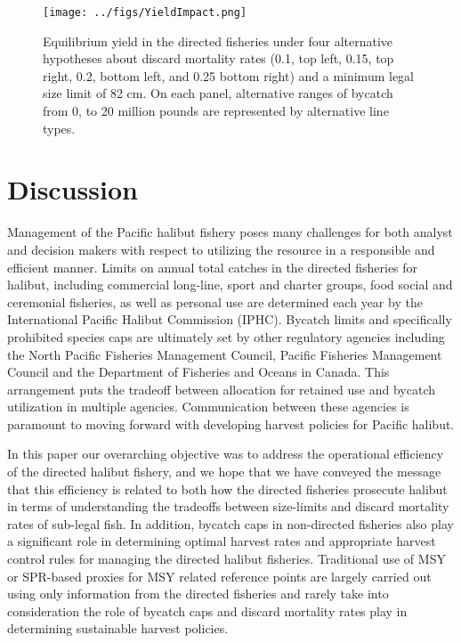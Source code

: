 \documentclass[12pt,leqno]{article}
\begin{document}
\begin{figure}
	\texttt{[image: ../figs/YieldImpact.png]}
	\caption{Equilibrium yield in the directed fisheries under four alternative hypotheses about discard mortality rates (0.1, top left, 0.15, top right, 0.2, bottom left, and 0.25 bottom right) and a minimum legal size limit of 82 cm. On each panel, alternative ranges of bycatch from 0, to 20 million pounds are represented by alternative line types.}\label{fig:YieldImpact}
\end{figure}


\section*{Discussion}

Management of the Pacific halibut fishery poses many challenges for both analyst and decision makers with respect to utilizing the resource in a responsible and efficient manner.  Limits on annual total catches in the directed fisheries for halibut, including commercial long-line, sport and charter groups, food social and ceremonial fisheries, as well as personal use are determined each year by the International Pacific Halibut Commission (IPHC).  Bycatch limits and specifically prohibited species caps are ultimately set by other regulatory agencies including the North Pacific Fisheries Management Council, Pacific Fisheries Management Council and the Department of Fisheries and Oceans in Canada.  This arrangement puts the tradeoff between allocation for retained use and bycatch utilization in multiple agencies. Communication between these agencies is paramount to moving forward with developing harvest policies for Pacific halibut.

In this paper our overarching objective was to address the operational efficiency of the directed halibut fishery, and we hope that we have conveyed the message that this efficiency is related to both how the directed fisheries prosecute halibut in terms of understanding the tradeoffs between size-limits and  discard mortality rates of sub-legal fish.  In addition, bycatch caps in non-directed fisheries also play a significant role in determining optimal harvest rates and appropriate harvest control rules for managing the directed halibut fisheries.  Traditional use of MSY or SPR-based proxies for MSY related reference points are largely carried out using only information from the directed fisheries and rarely take into consideration the role of bycatch caps and discard mortality rates play in determining sustainable harvest policies.
\end{document}
